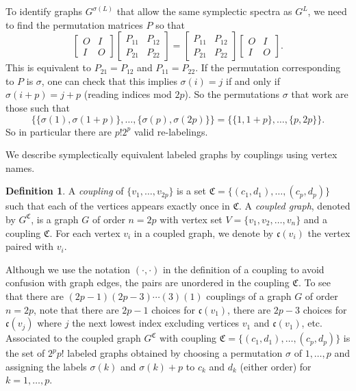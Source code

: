 \documentclass[12pt]{article}
\theoremstyle{definition}
\theoremstyle{definition}
\newtheorem{defn}[thm]{Definition}
\theoremstyle{definition}
\numberwithin{figure}{section}
\numberwithin{equation}{section}
\newcommand{\GC}[2]{#1 ^ {\mathfrak #2}}
\newcommand{\PP}{\mathfrak{C}}
\newcommand{\pp}{\mathfrak{c}}
\begin{document}
To identify  graphs  $G^{\sigma(L)}$ that allow the same symplectic spectra as $G^L$,  we need to find  the permutation matrices $P$ so that 
\[ 
\left[
\begin{array}{cc}
O & I\\
I & O  
\end{array}
\right]
\left[ \begin{array}{cc} 
 P_{11} &  P_{12} \\
 P_{21} & P_{22} 
 \end{array} \right] 
 = 
\left[ \begin{array}{cc} 
 P_{11} &  P_{12} \\
 P_{21} & P_{22} 
 \end{array} \right] 
 \left[
\begin{array}{cc}
O & I\\
I & O  
\end{array}
\right].
\] 
This is equivalent to $P_{21}=P_{12}$  and $P_{11}=P_{22}$. 
If the permutation corresponding to $P$ is $\sigma$, one can check that this implies 
$\sigma(i) = j$  if and only if $\sigma(i+p)=j+p$ (reading indices mod $2p$).  So the permutations $\sigma$ that work are those such that 
\[ \{ \{ \sigma(1), \sigma(1+p)\}, \ldots, \{ \sigma(p), \sigma(2p)\} \}= \{ \{ 1, 1+p\}, \ldots, \{p, 2p\} \}. \] 
So in particular there are $p! 2^p$ valid re-labelings. 



We describe symplectically equivalent labeled graphs by couplings using vertex names. 

\begin{defn}
A \textit{coupling} of $\{v_1,\ldots, v_{2p}\}$ is a set $\PP=\{(c_1,d_1), \ldots, (c_p,d_p)\}$ such that each  of the vertices appears exactly once in $\PP$.
A \emph{coupled graph}, denoted by $\GC G C$, is a graph $G$ of order $n=2p$     with vertex set $V=\{v_1, v_2, \ldots, v_n\}$ and a coupling  $\PP$.  For each vertex $v_i$ in a coupled graph, we denote by $\pp(v_i)$ the vertex paired with $v_i$.
\end{defn}
Although we use the notation $(\cdot,\cdot)$ in the definition of a coupling to avoid confusion with graph edges, the pairs are unordered 
 in the coupling $\PP$. 
To see that there are  $(2p-1)(2p-3)\cdots (3)(1)$ couplings of a graph $G$ of order $n=2p$, note that there are $2p-1$ choices for   $\pp(v_1)$,   there are $2p-3$ choices for $\pp(v_j)$ where $j$ the next lowest index  excluding vertices $v_1$ and $\pp(v_1)$, etc.  
Associated to the coupled graph $G^\PP$  
with coupling $\PP=\{(c_1,d_1), \ldots, (c_p,d_p)\}$ is the set of $2^pp!$ labeled graphs obtained by  choosing a permutation $\sigma$ of $1,\dots,p$ and assigning the labels  $\sigma(k)$ and  $\sigma(k)+p$    
to $c_k$ and $d_k$ (either order) for $k=1,\dots,p$.  
\end{document}
